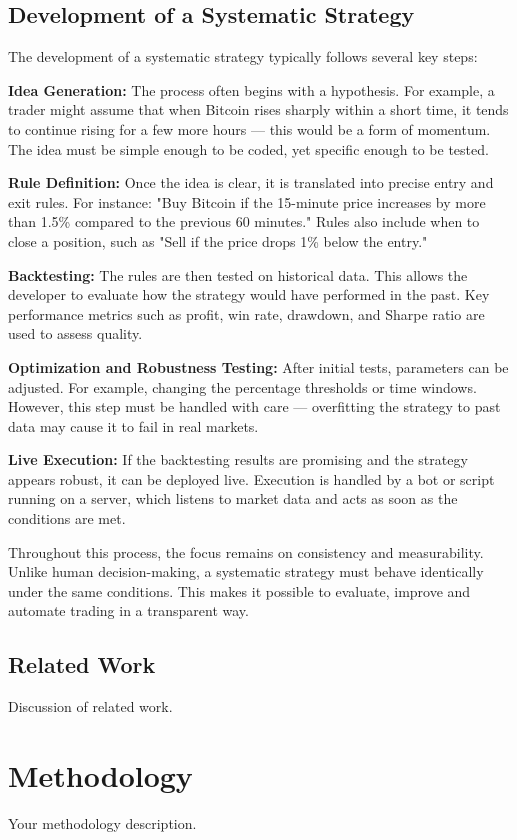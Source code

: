 \documentclass[12pt]{article}
\begin{document}
\newpage

\subsection{Development of a Systematic Strategy}


The development of a systematic strategy typically follows several key steps:

\textbf{Idea Generation:}  
The process often begins with a hypothesis. For example, a trader might assume that when Bitcoin rises sharply within a short time, it tends to continue rising for a few more hours — this would be a form of momentum. The idea must be simple enough to be coded, yet specific enough to be tested.

\textbf{Rule Definition:}  
Once the idea is clear, it is translated into precise entry and exit rules. For instance: "Buy Bitcoin if the 15-minute price increases by more than 1.5\% compared to the previous 60 minutes." Rules also include when to close a position, such as "Sell if the price drops 1\% below the entry."

\textbf{Backtesting:}  
The rules are then tested on historical data. This allows the developer to evaluate how the strategy would have performed in the past. Key performance metrics such as profit, win rate, drawdown, and Sharpe ratio are used to assess quality.

\textbf{Optimization and Robustness Testing:}  
After initial tests, parameters can be adjusted. For example, changing the percentage thresholds or time windows. However, this step must be handled with care — overfitting the strategy to past data may cause it to fail in real markets.

\textbf{Live Execution:}  
If the backtesting results are promising and the strategy appears robust, it can be deployed live. Execution is handled by a bot or script running on a server, which listens to market data and acts as soon as the conditions are met.

Throughout this process, the focus remains on consistency and measurability. Unlike human decision-making, a systematic strategy must behave identically under the same conditions. This makes it possible to evaluate, improve and automate trading in a transparent way.








\newpage
\subsection{Related Work}
Discussion of related work.


\newpage
\section{Methodology}
Your methodology description.



\newpage
\end{document}
